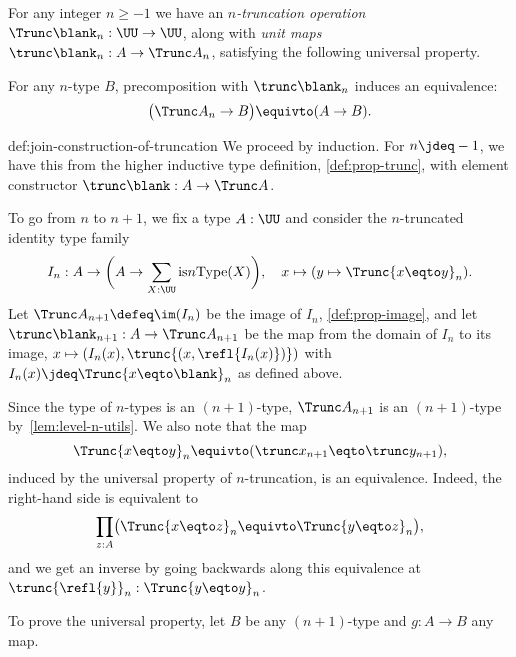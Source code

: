 \begin{construction}\label{def:join-construction-of-truncation}
  For any integer $n\ge-1$ we have an \emph{$n$-truncation operation}
  $\Trunc\blank_n : \UU \to \UU$, along with \emph{unit maps}
  $\trunc\blank_n : A \to \Trunc A_n$, satisfying the following universal property.

  For any $n$-type $B$, precomposition with $\trunc\blank_n$ induces an equivalence:
  \[
    \bigl(\Trunc A_n\to B\bigr) \equivto (A \to B).
  \]
\end{construction}
\begin{implementation}{def:join-construction-of-truncation}
  We proceed by induction.
  For $n\jdeq-1$, we have this from the higher inductive type
  definition, \cref{def:prop-trunc},
  with element constructor $\trunc\blank:A \to \Trunc A$.

  To go from $n$ to $n+1$, we fix a type $A:\UU$ and consider the
  $n$-truncated identity type family
  \[
    I_n : A \to \biggl(A \to \sum_{X:\UU}\mathrm{is}{n}\mathrm{Type}(X)\biggr),
    \quad
    x \mapsto (y \mapsto \Trunc{x\eqto y}_n).
  \]
  Let $\Trunc A_{n+1} \defeq \im(I_n)$ be the image of $I_n$,
  \cref{def:prop-image}, and let $\trunc\blank_{n+1}: A\to\Trunc A_{n+1}$
  be the map from the domain of $I_n$ to its image,
  $x \mapsto (I_n(x),\trunc{(x,\refl{I_n(x)})})$  with
  $I_n(x) \jdeq \Trunc{x\eqto\blank}_n$ as defined above.

  Since the type of $n$-types is an $(n+1)$-type,
  $\Trunc A_{n+1}$ is an $(n+1)$-type by~\cref{lem:level-n-utils}.
  We also note that the map
  \begin{equation}\label{eq:trunc-path-eq}
    \Trunc{x\eqto y}_n \equivto (\trunc x_{n+1} \eqto \trunc y_{n+1}),
  \end{equation}
  induced by the universal property of $n$-truncation,
  is an equivalence.
  Indeed, the right-hand side is equivalent to
  \[
    \prod_{z:A} \bigl(\Trunc{x\eqto z}_n \equivto \Trunc{y\eqto z}_n\bigr),
  \]
  and we get an inverse by going backwards along this equivalence at
  $\trunc{\refl{y}}_n : \Trunc{y\eqto y}_n$.

  To prove the universal property, let $B$ be any $(n+1)$-type
  and $g : A \to B$ any map.


\end{implementation}
